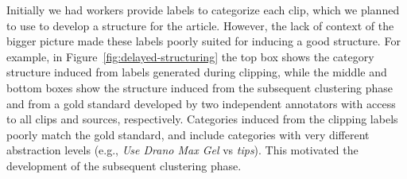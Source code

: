 


Initially we had workers provide labels to categorize each clip, which we planned to use to develop a structure for the article. However, the lack of context of the bigger picture made these labels poorly suited for inducing a good structure. For example, in Figure~\ref{fig:delayed-structuring} the top box shows the category structure induced from labels generated during clipping, while the middle and bottom boxes show the structure induced from the subsequent clustering phase and from a gold standard developed by two independent annotators with access to all clips and sources, respectively. Categories induced from the clipping labels poorly match the gold standard, and include categories with very different abstraction levels (e.g., \textit{Use Drano Max Gel} vs \textit{tips}). This motivated the development of the subsequent clustering phase.


